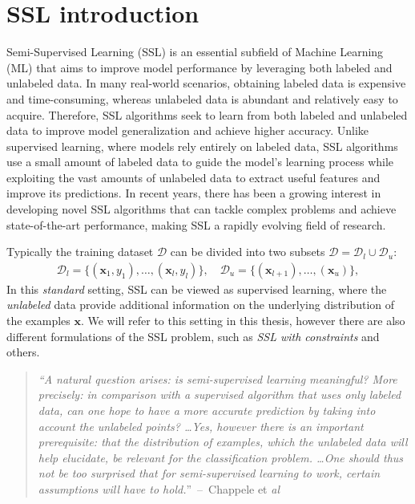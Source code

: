 \section{SSL introduction}
\label{sec:ssl-introduction}
Semi-Supervised Learning (SSL) is an essential subfield of Machine Learning (ML) that aims to improve model performance by leveraging 
both labeled and unlabeled data. In many real-world scenarios, obtaining labeled data is expensive and time-consuming, whereas 
unlabeled data is abundant and relatively easy to acquire. Therefore, SSL algorithms seek to learn from both labeled and unlabeled 
data to improve model generalization and achieve higher accuracy. Unlike supervised learning, where models rely entirely on labeled 
data, SSL algorithms use a small amount of labeled data to guide the model's learning process while exploiting the vast amounts of 
unlabeled data to extract useful features and improve its predictions. In recent years, there has been a growing interest in developing
novel SSL algorithms that can tackle complex problems and achieve state-of-the-art performance, making SSL a rapidly evolving field of 
research. 

Typically the training dataset $\mathcal{D}$ can be divided into two subsets $\mathcal{D} = \mathcal{D}_l \cup \mathcal{D}_u$:
\begin{align*}
    \mathcal{D}_l = \{(\mathbf{x}_1,y_1),\dots, (\mathbf{x}_l,y_l)\},\quad \mathcal{D}_u = \{(\mathbf{x}_{l+1}),\dots,(\mathbf{x}_{u})\},
\end{align*}
In this \textit{standard} setting, SSL can be viewed as supervised learning, where 
the \textit{unlabeled} data provide additional information on the underlying distribution of the examples $\mathbf{x}$.
We will refer to this setting in this thesis, however there are also different formulations of the SSL problem, such as \textit{SSL with constraints}
and others\cite[p. 1]{ssl-book-2006}.

\begin{quote}
    \textit{
    ``A natural question arises: is semi-supervised learning meaningful? More precisely:
    in comparison with a supervised algorithm that uses only labeled data, can one
    hope to have a more accurate prediction by taking into account the unlabeled
    points? \dots Yes, however there is an important prerequisite: that the
    distribution of examples, which the unlabeled data will help elucidate, be relevant
    for the classification problem.
    \dots One should thus not be too surprised that for semi-supervised learning to work,
    certain assumptions will have to hold.}''~--~Chappele et \textit{al}\cite[p. 4]{ssl-book-2006}
\end{quote}

